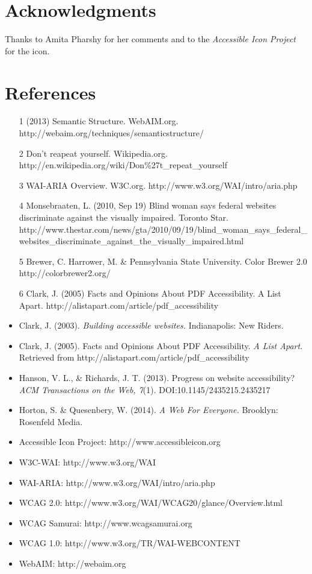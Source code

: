 \documentclass{acm_proc_article-sp}
\begin{document}
\section{Acknowledgments}
Thanks to Amita Pharshy for her comments and to the {\it Accessible Icon Project} for the icon.

\section{References}
\begin{itemize}
\item[1] (2013) Semantic Structure. WebAIM.org. http://webaim.org/techniques/semanticstructure/
\item[2] Don't reapeat yourself. Wikipedia.org. http://en.wikipedia.org/wiki/Don\%27t\_repeat\_yourself
\item[3] WAI-ARIA Overview. W3C.org. http://www.w3.org/WAI/intro/aria.php
\item[4] Monsebraaten, L. (2010, Sep 19) Blind woman says federal websites discriminate against the visually
impaired. Toronto Star.
http://www.thestar.com/news/gta/2010/09/19/blind\_woman\_says\_federal\_websites\_discriminate\_against\_the\_visually\_impaired.html
\item[5] Brewer, C. Harrower, M. \& Pennsylvania State University. Color Brewer 2.0 http://colorbrewer2.org/
\item[6] Clark, J. (2005) Facts and Opinions About PDF Accessibility. A List Apart.
http://alistapart.com/article/pdf\_accessibility
\item Clark, J. (2003). {\it Building accessible websites.} Indianapolis: New Riders.
\item Clark, J. (2005). Facts and Opinions About PDF Accessibility. {\it A List Apart}. Retrieved from http://alistapart.com/article/pdf\_accessibility
\item Hanson, V. L., \& Richards, J. T. (2013). Progress on website accessibility? {\it ACM Transactions on the Web, 7}(1). DOI:10.1145/2435215.2435217
\item Horton, S. \& Quesenbery, W. (2014). {\it A Web For Everyone.} Brooklyn: Rosenfeld Media.
\item Accessible Icon Project: http://www.accessibleicon.org
\item W3C-WAI: http://www.w3.org/WAI
\item WAI-ARIA: http://www.w3.org/WAI/intro/aria.php
\item WCAG 2.0: http://www.w3.org/WAI/WCAG20/glance/Overview.html
\item WCAG Samurai: http://www.wcagsamurai.org
\item WCAG 1.0: http://www.w3.org/TR/WAI-WEBCONTENT
\item WebAIM: http://webaim.org		
\end{itemize}
\end{document}
